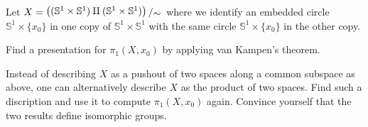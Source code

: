 \documentclass[11pt]{book}
\numberwithin{dummy}{section}
\theoremstyle{nonumberbreak}
\newenvironment{sol}[1][]{\ifthenelse{\equal{#1}{}}{\solution}{\solution[#1]}\rm}{\endsolution}
\newenvironment{prob}[1][]{\ifthenelse{\equal{#1}{}}{\problem}{\problem[#1]}\rm}{\endproblem}
\newcommand{\Sph}{\mathbb{S}}
\newcommand{\slant}[2]{{\raisebox{.1em}{$#1$}\left/\raisebox{-.1em}{$#2$}\right.}}
\begin{document}
\begin{spacing}{1.4}
\begin{prob}
\begin{sol}
\end{sol}
\end{prob}



\begin{prob}    %
Let $X= \slant{\left( (\Sph^1 \times \Sph^1) \amalg (\Sph^1 \times \Sph^1) \right)}{\sim}$ where we identify an embedded circle $\Sph^1 \times \{x_0\}$ in one copy of $\Sph^1 \times \Sph^1$ with the same circle $\mathbb{S}^1 \times \{x_0\}$ in the other copy.
\begin{compactenum}
\item Find a presentation for $\pi_1(X,x_0)$ by applying van Kampen's theorem.
\item Instead of describing $X$ as a pushout of two spaces along a common subspace as above, one can alternatively describe $X$ as the product of two spaces. Find such a discription and use it to compute $\pi_1(X,x_0)$ again. Convince yourself that the two results define isomorphic groups.
\end{compactenum}


\end{prob}
\end{spacing}
\end{document}
